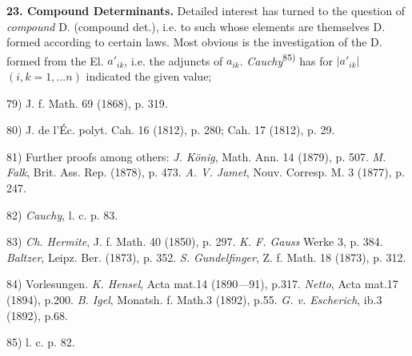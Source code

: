 \textbf{23. Compound Determinants.} Detailed interest has turned to the question of \textit{compound} D. (compound det.), i.e. to such whose elements are themselves D. formed according to certain laws. Most obvious is the investigation of the D. formed from the El. $a'_{ik}$, i.e. the adjuncts of $a_{ik}$. \textit{Cauchy}\textsuperscript{85)} has for $|a'_{ik}|$ $(i,k=1,...n)$ indicated the given value;

\vspace{-0.1cm}
\leftline{\rule{2in}{0.4pt}}
\vspace{0.1cm}
{
\footnotesize
79) J. f. Math. 69 (1868), p. 319.

80) J. de l'Éc. polyt. Cah. 16 (1812), p. 280; Cah. 17 (1812), p. 29.

81) Further proofs among others: \textit{J. König}, Math. Ann. 14 (1879), p. 507. \textit{M. Falk}, Brit. Ass. Rep. (1878), p. 473. \textit{A. V. Jamet}, Nouv. Corresp. M. 3 (1877), p. 247.

82) \textit{Cauchy}, l. c. p. 83.

83) \textit{Ch. Hermite}, J. f. Math. 40 (1850), p. 297. \textit{K. F. Gauss} Werke 3, p. 384. \textit{Baltzer}, Leipz. Ber. (1873), p. 352. \textit{S. Gundelfinger}, Z. f. Math. 18 (1873), p. 312.

84) Vorlesungen. \textit{K. Hensel}, Acta mat.14 (1890—91), p.317. \textit{Netto}, Acta mat.17 (1894), p.200. \textit{B. Igel}, Monatsh. f. Math.3 (1892), p.55. \textit{G. v. Escherich}, ib.3 (1892), p.68.

85) l. c. p. 82.

}
